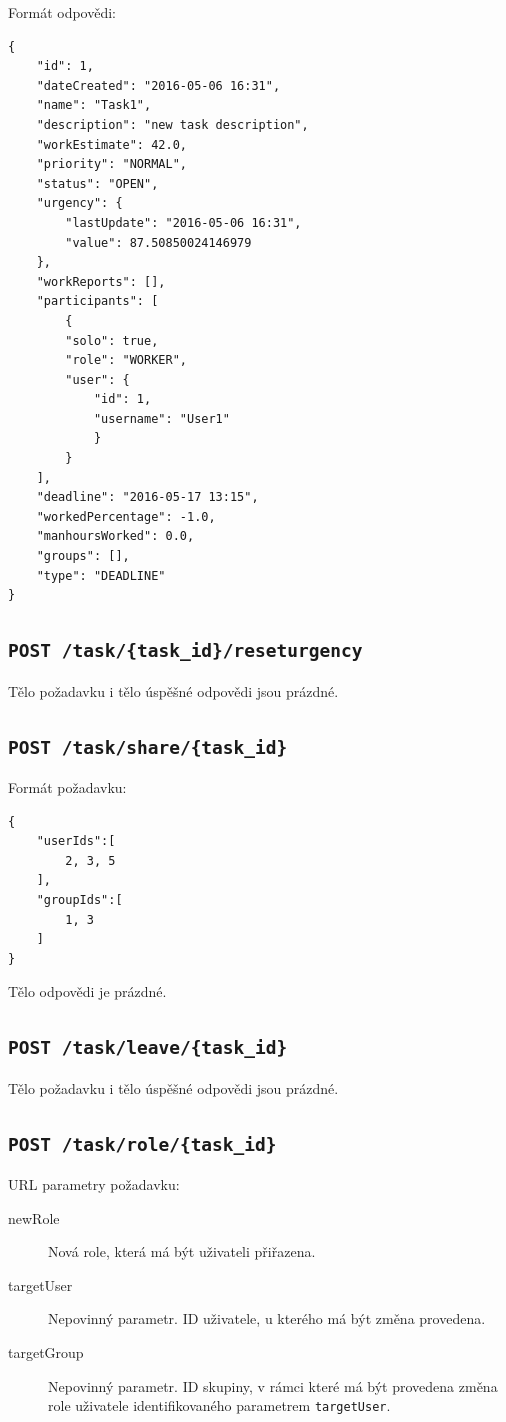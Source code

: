 \documentclass[thesis=B,czech]{FITthesis}[2012/06/26]
\begin{document}
		\noindent
		Formát odpovědi:
		\begin{Verbatim}[obeytabs,tabsize=2]
{
	"id": 1,
	"dateCreated": "2016-05-06 16:31",
	"name": "Task1",
	"description": "new task description",
	"workEstimate": 42.0,
	"priority": "NORMAL",
	"status": "OPEN",
	"urgency": {
		"lastUpdate": "2016-05-06 16:31",
		"value": 87.50850024146979
	},
	"workReports": [],
	"participants": [
		{
		"solo": true,
		"role": "WORKER",
		"user": {
			"id": 1,
			"username": "User1"
			}
		}
	],
	"deadline": "2016-05-17 13:15",
	"workedPercentage": -1.0,
	"manhoursWorked": 0.0,
	"groups": [],
	"type": "DEADLINE"
}
		\end{Verbatim}
		
		\subsection{\texttt{POST /task/\{task\_id\}/reseturgency}}
			Tělo požadavku i tělo úspěšné odpovědi jsou prázdné.
		
		\subsection{\texttt{POST /task/share/\{task\_id\}}}
		Formát požadavku:
		\begin{Verbatim}[obeytabs,tabsize=2]
{
	"userIds":[
		2, 3, 5
	],
	"groupIds":[
		1, 3
	]
}
		\end{Verbatim}
		
		\noindent
		Tělo odpovědi je prázdné.
		
		\subsection{\texttt{POST /task/leave/\{task\_id\}}}
			Tělo požadavku i tělo úspěšné odpovědi jsou prázdné.
		
		\subsection{\texttt{POST /task/role/\{task\_id\}}}
			URL parametry požadavku:
			\begin{description}
				\item[newRole] Nová role, která má být uživateli přiřazena.
				\item[targetUser] Nepovinný parametr. ID uživatele, u kterého má být změna provedena.
				\item[targetGroup] Nepovinný parametr. ID skupiny, v rámci které má být provedena změna role uživatele identifikovaného parametrem \texttt{targetUser}.
			\end{description}
			
\end{document}

